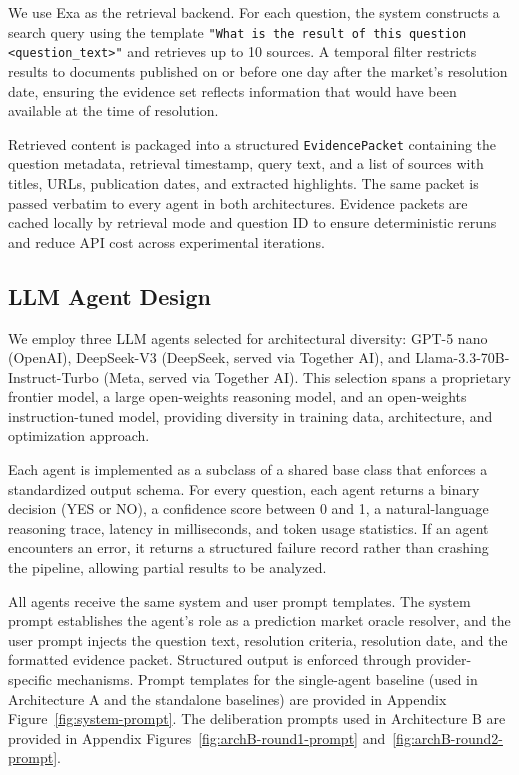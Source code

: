 We use Exa as the retrieval backend. For each question, the system constructs a search query using the template \texttt{"What is the result of this question \allowbreak <question\_text>"} and retrieves up to 10 sources. A temporal filter restricts results to documents published on or before one day after the market's resolution date, ensuring the evidence set reflects information that would have been available at the time of resolution.

Retrieved content is packaged into a structured \texttt{EvidencePacket} containing the question metadata, retrieval timestamp, query text, and a list of sources with titles, URLs, publication dates, and extracted highlights. The same packet is passed verbatim to every agent in both architectures. Evidence packets are cached locally by retrieval mode and question ID to ensure deterministic reruns and reduce API cost across experimental iterations.

\subsection{LLM Agent Design}

We employ three LLM agents selected for architectural diversity: GPT-5 nano (OpenAI), DeepSeek-V3 (DeepSeek, served via Together AI), and Llama-3.3-70B-Instruct-Turbo (Meta, served via Together AI). This selection spans a proprietary frontier model, a large open-weights reasoning model, and an open-weights instruction-tuned model, providing diversity in training data, architecture, and optimization approach.

Each agent is implemented as a subclass of a shared base class that enforces a standardized output schema. For every question, each agent returns a binary decision (YES or NO), a confidence score between 0 and 1, a natural-language reasoning trace, latency in milliseconds, and token usage statistics. If an agent encounters an error, it returns a structured failure record rather than crashing the pipeline, allowing partial results to be analyzed.

All agents receive the same system and user prompt templates. The system prompt establishes the agent's role as a prediction market oracle resolver, and the user prompt injects the question text, resolution criteria, resolution date, and the formatted evidence packet. Structured output is enforced through provider-specific mechanisms. Prompt templates for the single-agent baseline (used in Architecture A and the standalone baselines) are provided in Appendix Figure~\ref{fig:system-prompt}. The deliberation prompts used in Architecture B are provided in Appendix Figures~\ref{fig:archB-round1-prompt} and~\ref{fig:archB-round2-prompt}.

